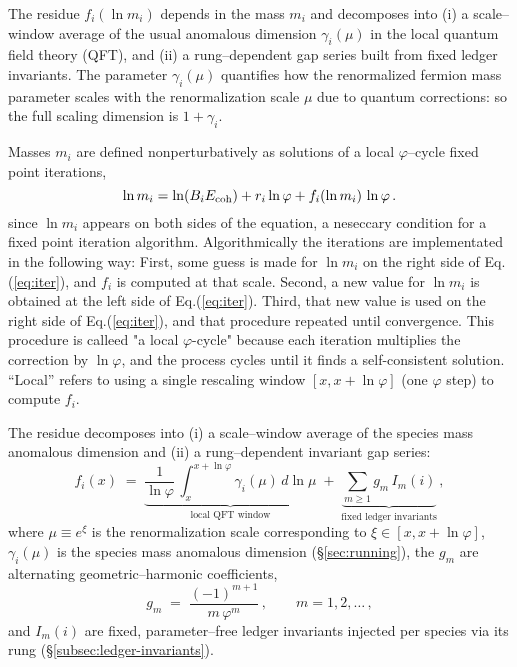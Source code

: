 \documentclass[%
 amsmath,amssymb,
 aps,
prb,
floatfix, showkeys
]{revtex4-2}
\begin{document}
The residue  $f_i(\ln m_i)$ depends in the mass $m_i$ and decomposes into
(i)  a scale–window average of the usual anomalous dimension $\gamma_i(\mu)$ in the
     local quantum field theory (QFT), and
(ii) a rung–dependent gap series built from fixed ledger invariants.
  The parameter  $\gamma_i(\mu)$ quantifies how the renormalized fermion mass parameter scales with the
renormalization scale $\mu$ due to quantum corrections: so the full scaling dimension is $1 + \gamma_i$.


     
     
Masses $m_i$ are defined nonperturbatively as solutions of a
local $\varphi$–cycle fixed point
iterations, 
\begin{equation}
  \ln m_i = \ln(B_iE_{\rm coh}) + r_i\ln\varphi + f_i(\ln m_i)\,\ln\varphi\,.
\label{eq:iter}
\end{equation}
since $\ln m_i$ appears on both sides of the equation, a neseccary condition for a
fixed point iteration algorithm.  Algorithmically the iterations are implementated in the following way:
First,  some guess is made for  $\ln m_i$ on the right side of Eq.(\ref{eq:iter}),
and  $f_i$ is computed at that scale. Second,
a new value for $\ln m_i$ is obtained at the left side of Eq.(\ref{eq:iter}). Third,
that new value is used on the right side of Eq.(\ref{eq:iter}), and that procedure
repeated  until convergence.  This procedure is calleed "a local $\varphi$-cycle"
because each iteration multiplies the correction by
    $\ln \varphi$, and the process cycles until it finds a self-consistent solution. 
“Local” refers to using a single rescaling window $[x, x+\ln \varphi]$ (one $\varphi$ step)
to compute $f_i$.

The residue decomposes into (i) a scale–window average of the species mass anomalous dimension and
(ii) a rung–dependent invariant gap series:
\begin{equation}
  f_i(x) \;=\; \underbrace{\frac{1}{\ln\varphi}\,\int_{x}^{x+\ln\varphi}\!\gamma_i(\mu)\,d\ln\mu}_{\text{local QFT window}}
  \;+\; \underbrace{\sum_{m\ge 1} g_m\,I_m(i)}_{\text{fixed ledger invariants}}\,,
  \label{eq:residue_local}
\end{equation}
where $\mu \equiv e^{\xi}$ is the renormalization scale corresponding to $\xi\in[x,x+\ln\varphi]$,
$\gamma_i(\mu)$ is the species mass anomalous dimension (\S\ref{sec:running}),
the $g_m$ are alternating geometric–harmonic coefficients,
\begin{equation}
  g_m \;=\; \frac{(-1)^{m+1}}{m\,\varphi^{m}}\,, \qquad m=1,2,\dots\,,
  \label{eq:gap_coeffs}
\end{equation}
and $I_m(i)$ are fixed, parameter–free ledger invariants injected per species via its rung (\S\ref{subsec:ledger-invariants}).
\end{document}
